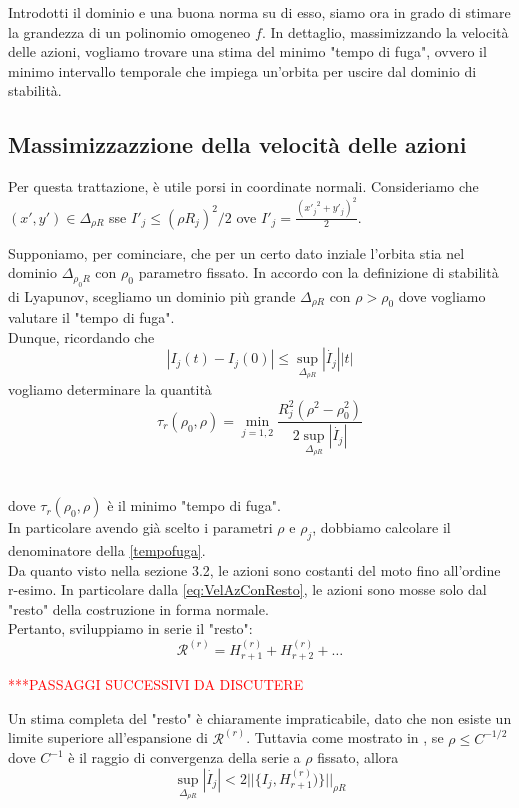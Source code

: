 \documentclass[a4paper,11pt,titlepage]{report}
\theoremstyle{definition}
\theoremstyle{plain}
\begin{document}
Introdotti il dominio e una buona norma su di esso, siamo ora in grado di stimare la grandezza di un polinomio omogeneo $f$.
In dettaglio, massimizzando la velocità delle azioni, vogliamo trovare una stima del minimo "tempo di fuga", ovvero il minimo intervallo temporale che impiega un'orbita per uscire dal dominio di stabilità.

\subsection{Massimizzazzione della velocità delle azioni}

Per questa trattazione, è utile porsi in coordinate normali.
Consideriamo che $(x',y') \in \varDelta_{\rho R} $ sse $I'_j \leq (\rho R_j)^2/2 $   ove $I'_j = \frac{({x'_j}^{2} + {y'_j})^{2}}{2}$.

Supponiamo, per cominciare, che per un certo dato inziale l'orbita stia nel dominio $\varDelta_{\rho_0 R}$ con $\rho_0$ parametro fissato.
In accordo con la definizione di stabilità di Lyapunov, scegliamo un dominio più grande $\varDelta_{\rho R}$ con $\rho > \rho_0 $ dove vogliamo valutare il "tempo di fuga". \\Dunque, ricordando che $$|I_j(t) - I_j(0)| \leq \sup_{ \varDelta_{\rho R} }|\dot{I_j}| |t| $$ vogliamo determinare la quantità
\begin{equation}
\label{tempofuga}
	\tau_r( \rho_0, \rho) = \min_{j=1,2} \frac{R_j^2(\rho^2-\rho_0^2)}{2\sup_{ \varDelta_{\rho R} }|\dot{I_j}|} 
\end{equation}\\\\
dove $\tau_r( \rho_0, \rho)$ è il minimo "tempo di fuga".
\\In particolare avendo già scelto i parametri $\rho$ e $\rho_j$, dobbiamo calcolare il denominatore della \ref{tempofuga}.
\\Da quanto visto nella sezione 3.2, le azioni sono costanti del moto fino all'ordine r-esimo. In particolare dalla \ref{eq:VelAzConResto}, le azioni sono mosse solo dal "resto" della costruzione in forma normale.
\\Pertanto, sviluppiamo in serie il "resto": $$ \mathcal{R}^{(r)} = H_{r+1}^{(r)} + H_{r+2}^{(r)}+\dots$$

\textcolor{red}{***PASSAGGI SUCCESSIVI DA DISCUTERE}

Un stima completa del "resto" è chiaramente impraticabile, dato che non esiste un limite superiore all'espansione di $ \mathcal{R}^{(r)}$.
Tuttavia come mostrato in \cite{1989}, se $\rho \leq C^{-1 /2}$ dove $C^{-1}$ è il raggio di convergenza della serie a $\rho$ fissato, allora 
\begin{equation}
\label{eq:supI}
\sup_{ \varDelta_{\rho R} }|\dot{I_j}| < 2 ||\{I_j, H_{r+1}^{(r)})\}||_{\rho R}
\end{equation} 
\end{document}
